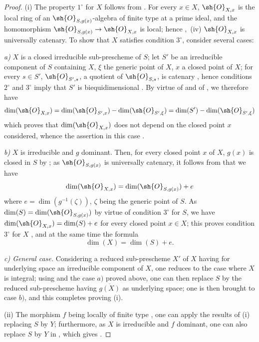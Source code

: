 \begin{proof}
(i) The property $1^\circ$ for $X$ follows from .
For every $x\in X$, $\sh{O}_{X,x}$ is the local ring of an $\sh{O}_{S,g(x)}$-algebra of finite type at a prime ideal, and the homomorphism $\sh{O}_{S,g(x)}\to\sh{O}_{X,x}$
is local; hence ,~(iv) $\sh{O}_{X,x}$ is universally catenary.
To show that $X$ satisfies condition $3^\circ$, consider several cases:

\emph{a)} $X$ is a closed irreducible sub-prescheme of $S$; let $S'$ be an irreducible component of $S$ containing $X$, $\xi$ the generic point of $X$, $x$ a closed point of $X$; for every $s\in S'$, $\sh{O}_{S',s}$, a quotient of $\sh{O}_{S,s}$, is catenary , hence conditions $2^\circ$ and $3^\circ$ imply that $S'$ is biequidimensional .
By virtue of  and of , we therefore have
\[
  \dim(\sh{O}_{X,x})=\dim(\sh{O}_{S',x})-\dim(\sh{O}_{S',\xi})=\dim(S')-\dim(\sh{O}_{S',\xi})
\]
which proves that $\dim(\sh{O}_{X,x})$ does not depend on the closed point $x$ considered, whence the assertion in this case .

\emph{b)} $X$ is irreducible and $g$ dominant.
Then, for every closed point $x$ of $X$, $g(x)$ is closed in $S$ by ; as $\sh{O}_{S,g(x)}$ is universally catenary, it follows from  that we have
\[
  \dim(\sh{O}_{X,x})=\dim(\sh{O}_{S,g(x)})+e
\]
where $e=\dim(g^{-1}(\zeta))$, $\zeta$ being the generic point of $S$.
As $\dim(S)=\dim(\sh{O}_{S,g(x)})$ by virtue of condition $3^\circ$ for $S$, we have $\dim(\sh{O}_{X,x})=\dim(S)+e$ for every closed point $x\in X$; this proves condition $3^\circ$ for $X$ , and at the same time the formula
\begin{equation}
\label{IV.10.6.1.4}
\tag{10.6.1.4}
\dim(X)=\dim(S)+e.
\end{equation}

\emph{c) General case.}
Considering a reduced sub-prescheme $X'$ of $X$ having for underlying space an irreducible component of $X$, one reduces to the case where $X$ is integral; using  and the case $a)$ proved above, one can then replace $S$ by the reduced sub-prescheme having $\overline{g(X)}$ as underlying space; one is then brought to case $b)$, and this completes proving (i).

(ii) The morphism $f$ being locally of finite type , one can apply the results of (i) replacing $S$ by $Y$; furthermore, as $X$ is irreducible and $f$ dominant, one can also replace $S$ by $Y$ in , which gives .


\end{proof}
